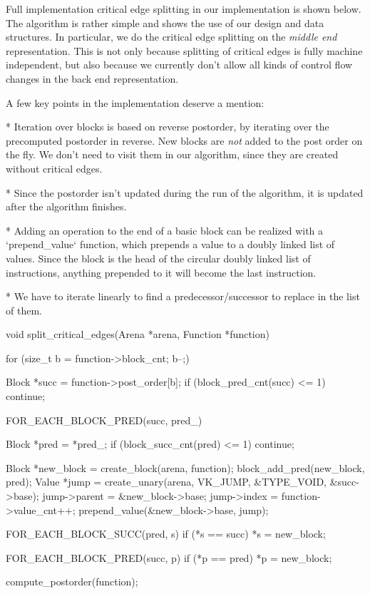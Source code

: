 Full implementation critical edge splitting in our implementation is shown
below. The algorithm is rather simple and shows the use of our design and data
structures. In particular, we do the critical edge splitting on the {\em middle
end} representation. This is not only because splitting of critical edges is
fully machine independent, but also because we currently don't allow all kinds
of control flow changes in the back end representation.

A few key points in the implementation deserve a mention:

\begitems

* Iteration over blocks is based on reverse postorder, by iterating over the
precomputed postorder in reverse. New blocks are {\em not} added to the post
order on the fly. We don't need to visit them in our algorithm, since they are
created without critical edges.

* Since the postorder isn't updated during the run of the algorithm, it is
updated after the algorithm finishes.

* Adding an operation to the end of a basic block can be realized with a
`prepend_value` function, which prepends a value to a doubly linked list of
values. Since the block is the head of the circular doubly linked list of
instructions, anything prepended to it will become the last instruction.

* We have to iterate linearly to find a predecessor/successor to replace in the
list of them.

\enditems

\begtt
void split_critical_edges(Arena *arena, Function *function) {
	for (size_t b = function->block_cnt; b--;) {
		Block *succ = function->post_order[b];
		if (block_pred_cnt(succ) <= 1)
			continue;

		FOR_EACH_BLOCK_PRED(succ, pred_) {
			Block *pred = *pred_;
			if (block_succ_cnt(pred) <= 1)
				continue;

			Block *new_block = create_block(arena, function);
			block_add_pred(new_block, pred);
			Value *jump = create_unary(arena, VK_JUMP, &TYPE_VOID, &succ->base);
			jump->parent = &new_block->base;
			jump->index = function->value_cnt++;
			prepend_value(&new_block->base, jump);

			FOR_EACH_BLOCK_SUCC(pred, s)
				if (*s == succ)
					*s = new_block;

			FOR_EACH_BLOCK_PRED(succ, p)
				if (*p == pred)
					*p = new_block;
		}
	}

	compute_postorder(function);
}
\endtt

